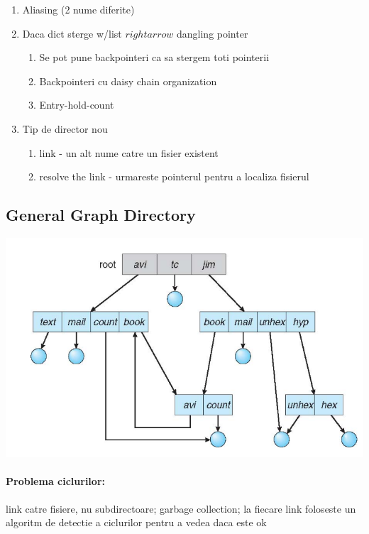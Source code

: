 \documentclass{article}
\begin{document}
\begin{enumerate}
    \item Aliasing (2 nume diferite)
    \item Daca dict sterge w/list $rightarrow$ dangling pointer
          \begin{enumerate}
              \item Se pot pune backpointeri ca sa stergem toti pointerii
              \item Backpointeri cu daisy chain organization
              \item Entry-hold-count
          \end{enumerate}
    \item Tip de director nou
          \begin{enumerate}
              \item link - un alt nume catre un fisier existent
              \item resolve the link - urmareste pointerul pentru a localiza fisierul
          \end{enumerate}
\end{enumerate}

\subsection*{General Graph Directory}
\begin{center}
    \includegraphics[scale=0.4]{46-ggd.png}
\end{center}
\paragraph*{Problema ciclurilor:} link catre fisiere, nu subdirectoare; garbage collection; la fiecare link foloseste un algoritm de detectie a ciclurilor pentru a vedea daca este ok
\end{document}
